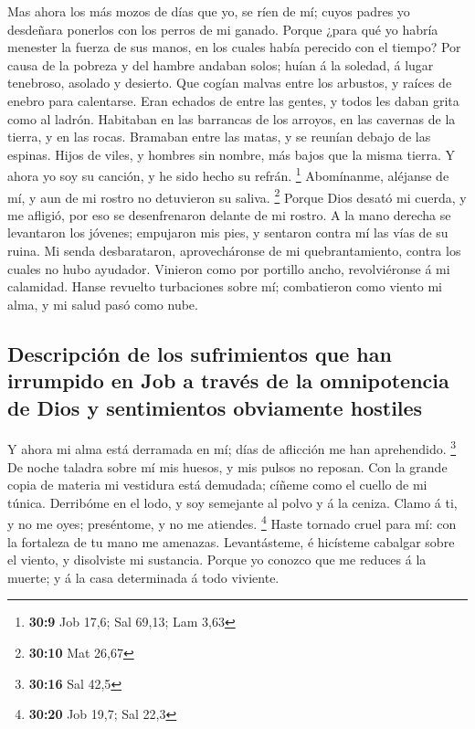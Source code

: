  Mas ahora los más mozos de días que yo, se ríen de mí;
cuyos padres yo desdeñara ponerlos con los perros de mi ganado.
 Porque ¿para qué yo habría menester la fuerza de sus manos,
en los cuales había perecido con el tiempo?  Por causa de la
pobreza y del hambre andaban solos; huían á la soledad, á lugar
tenebroso, asolado y desierto.  Que cogían malvas entre los
arbustos, y raíces de enebro para calentarse.  Eran echados
de entre las gentes, y todos les daban grita como al ladrón.
 Habitaban en las barrancas de los arroyos, en las cavernas
de la tierra, y en las rocas.  Bramaban entre las matas, y
se reunían debajo de las espinas.  Hijos de viles, y hombres
sin nombre, más bajos que la misma tierra.  Y ahora yo soy
su canción, y he sido hecho su refrán. \footnote{\textbf{30:9} Job 17,6;
  Sal 69,13; Lam 3,63}  Abomínanme, aléjanse de mí, y aun
de mi rostro no detuvieron su saliva. \footnote{\textbf{30:10} Mat 26,67}
 Porque Dios desató mi cuerda, y me afligió, por eso se
desenfrenaron delante de mi rostro.  A la mano derecha se
levantaron los jóvenes; empujaron mis pies, y sentaron contra mí las
vías de su ruina.  Mi senda desbarataron, aprovecháronse de
mi quebrantamiento, contra los cuales no hubo ayudador. 
Vinieron como por portillo ancho, revolviéronse á mi calamidad.
 Hanse revuelto turbaciones sobre mí; combatieron como
viento mi alma, y mi salud pasó como nube.

\hypertarget{descripciuxf3n-de-los-sufrimientos-que-han-irrumpido-en-job-a-travuxe9s-de-la-omnipotencia-de-dios-y-sentimientos-obviamente-hostiles}{%
\subsection{Descripción de los sufrimientos que han irrumpido en Job a
través de la omnipotencia de Dios y sentimientos obviamente
hostiles}\label{descripciuxf3n-de-los-sufrimientos-que-han-irrumpido-en-job-a-travuxe9s-de-la-omnipotencia-de-dios-y-sentimientos-obviamente-hostiles}}

 Y ahora mi alma está derramada en mí; días de aflicción me
han aprehendido. \footnote{\textbf{30:16} Sal 42,5}  De
noche taladra sobre mí mis huesos, y mis pulsos no reposan.
 Con la grande copia de materia mi vestidura está demudada;
cíñeme como el cuello de mi túnica.  Derribóme en el lodo,
y soy semejante al polvo y á la ceniza.  Clamo á ti, y no
me oyes; preséntome, y no me atiendes. \footnote{\textbf{30:20} Job
  19,7; Sal 22,3}  Haste tornado cruel para mí: con la
fortaleza de tu mano me amenazas.  Levantásteme, é
hicísteme cabalgar sobre el viento, y disolviste mi sustancia.
 Porque yo conozco que me reduces á la muerte; y á la casa
determinada á todo viviente.

